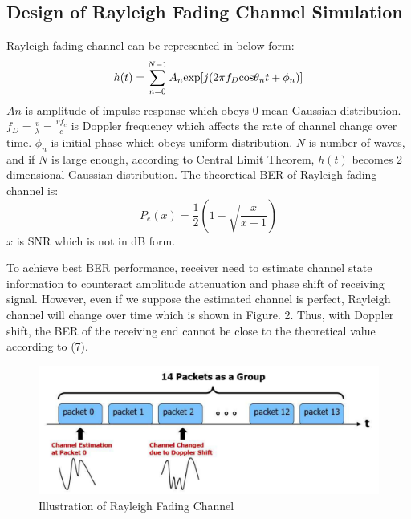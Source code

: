 \documentclass[technicalreport]{ieicej}
\begin{document}
\subsection{Design of Rayleigh Fading Channel Simulation}
Rayleigh fading channel can be represented in below form:
\begin{equation}
h(t)=\sum_{n=0}^{N-1}A_n{\rm exp}[j(2\pi f_D{\rm cos}\theta_nt+\phi_n)]
\end{equation}
$An$ is amplitude of impulse response which obeys 0 mean Gaussian distribution. $f_D=\frac{v}{\lambda}=\frac{vf_c}{c}$ is Doppler frequency which affects the rate of channel change over time. $\phi_n$ is initial phase which obeys uniform distribution. $N$ is number of waves, and if $N$ is large enough, according to Central Limit Theorem, $h(t)$ becomes 2 dimensional Gaussian distribution\cite{hoeffding1948central}. The theoretical BER of Rayleigh fading channel is\cite{ber}:
\begin{equation}
P_e(x)=\frac{1}{2}\left(1-\sqrt{\frac{x}{x+1}}\right)
\end{equation}
$x$ is SNR which is not in dB form.\par
To achieve best BER performance, receiver need to estimate channel state information to counteract amplitude attenuation and phase shift of receiving signal. However, even if we suppose the estimated channel is perfect, Rayleigh channel will change over time which is shown in Figure. 2. Thus, with Doppler shift, the BER of the receiving end cannot be close to the theoretical value according to (7).
\begin{figure}[tbp]
	\begin{center}
		\vspace{0cm}
		\includegraphics[width=\linewidth,clip]{fig/rayleigh_group.pdf}
		\caption{Illustration of Rayleigh Fading Channel}
		\label{fig:sample}
	\end{center}
\end{figure}
\end{document}
